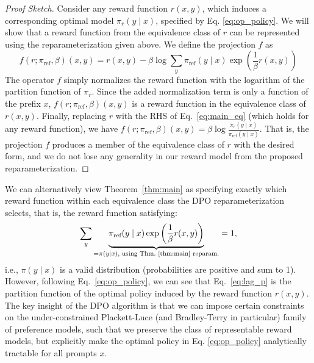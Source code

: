 \documentclass{article}
\begin{document}
\begin{proof}[Proof Sketch]
    Consider any reward function $r(x, y)$, which induces a corresponding optimal model $\pi_r(y \mid x)$, specified by Eq. \ref{eq:op_policy}. We will show that a reward function from the equivalence class of $r$ can be represented using the reparameterization given above. We define the projection $f$ as
\begin{equation}
    f(r; \pi_\text{ref}, \beta)(x, y) = r(x, y) - \beta\log\sum_{y}\pi_\text{ref}(y\mid x)\exp\left(\frac{1}{\beta}r(x, y)\right)
\end{equation}
The operator $f$ simply normalizes the reward function with the logarithm of the partition function of $\pi_r$. Since the added normalization term is only a function of the prefix $x$, $f(r; \pi_\text{ref}, \beta)(x, y) $ is a reward function in the equivalence class of $r(x, y)$. Finally, replacing $r$ with the RHS of Eq.~\ref{eq:main_eq} (which holds for any reward function), we have $f(r; \pi_\text{ref}, \beta)(x, y) = \beta \log \frac{\pi_r(y\mid x)}{\pi_\text{ref}(y\mid x)}$. That is, the projection $f$ produces a member of the equivalence class of $r$ with the desired form, and we do not lose any generality in our reward model from the proposed reparameterization.
\end{proof}
We can alternatively view Theorem~\ref{thm:main} as specifying exactly which reward function within each equivalence class the DPO reparameterization selects, that is, the reward function satisfying:
\begin{equation}\label{eq:lag_p}
     \sum_{y}\underbrace{\pi_\text{ref}(y\mid x)\exp\left(\frac{1}{\beta}r(x, y)\right)}_{=\pi(y\mid x)\text{, using Thm.~\ref{thm:main} reparam.}} = 1,
\end{equation}
i.e., $\pi(y\mid x)$ is a valid distribution (probabilities are positive and sum to 1).
However, following Eq.~\ref{eq:op_policy}, we can see that Eq.~\ref{eq:lag_p} is the partition function of the optimal policy induced by the reward function $r(x, y)$.
The key insight of the DPO algorithm is that we can impose certain constraints on the under-constrained Plackett-Luce (and Bradley-Terry in particular) family of preference models, such that we preserve the class of representable reward models, but explicitly make the optimal policy in Eq. \ref{eq:op_policy} analytically tractable for all prompts $x$.
\end{document}

